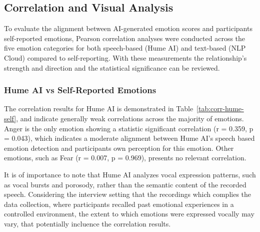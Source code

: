 \subsection{Correlation and Visual Analysis}
To evaluate the alignment between AI-generated emotion scores and participants self-reported emotions, 
Pearson correlation analyses were conducted across the five emotion categories for both speech-based (Hume AI) and text-based (NLP Cloud) compared to self-reporting.
With these measurements the relationship's strength and direction and the statistical significance can be reviewed. 

\subsubsection{Hume AI vs Self-Reported Emotions}
The correlation results for Hume AI is demonstrated in Table~\ref{tab:corr-hume-self}, and indicate generally weak correlations across the majority of emotions. 
Anger is the only emotion showing a statistic significant correlation (r = 0.359, p = 0.043), which indicates a moderate alignment between Hume AI's speech based emotion 
detection and participants own perception for this emotion. Other emotions, such as Fear (r = 0.007, p = 0.969), presents no relevant correlation. 

It is of importance to note that Hume AI analyzes vocal expression patterns, such as vocal bursts and porosody, rather than the semantic content of the recorded speech. 
Considering the interview setting that the recordings which complies the data collection, where participants recalled past emotional experiences in a controlled environment, 
the extent to which emotions were expressed vocally may vary, that potentially incluence the correlation results. 


